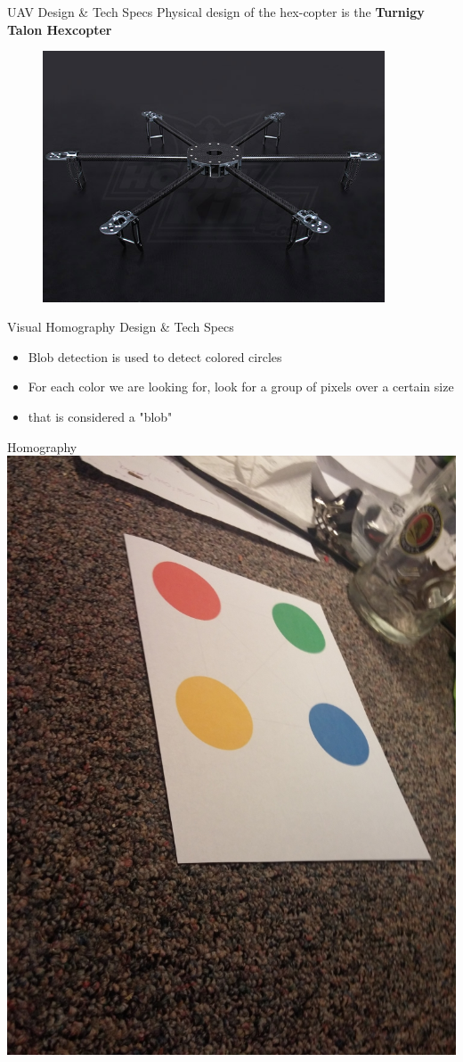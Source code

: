 \documentclass[11pt]{beamer}
\begin{document}
\begin{frame}{UAV Design \& Tech Specs}
	Physical design of the hex-copter is the \textbf{Turnigy Talon Hexcopter}
	
	\begin{figure}
		\includegraphics[width=4in]{images/TalonV1.jpg}
	\end{figure}

\end{frame}

\begin{frame}{Visual Homography Design \& Tech Specs}
	\begin{itemize}
		\item Blob detection is used to detect colored circles
		\item For each color we are looking for, look for a group of pixels over a certain size
		\item that is considered a "blob"
	\end{itemize}
\end{frame}

\begin{frame}{Homography}
	\centering
	\includegraphics[width=.66\textwidth]{images/skewball}
\end{frame}
\end{document}
